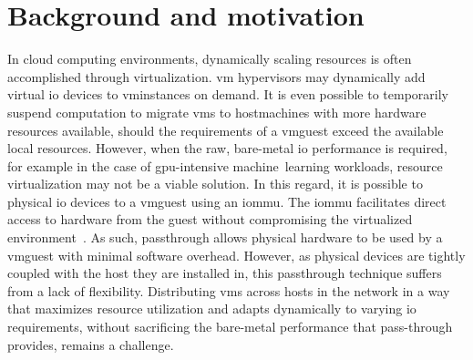 \section{Background and motivation}\label{sec:motivation}
In cloud computing environments, dynamically scaling resources is often accomplished through virtualization. 
%
\Gls{vm} \glspl{hypervisor} may dynamically add virtual \gls{io} devices to \glspl{vminstance} on demand.
%
It is even possible to temporarily suspend computation to migrate \glspl{vm} to \glspl{hostmachine} with more hardware resources available, should the requirements of a \gls{vmguest} exceed the available local resources.
%
However, when the raw, bare-metal \gls{io} performance is required, for example in the case of \gls{gpu}-intensive machine~learning workloads, resource virtualization may not be a viable solution.
%
In this regard, it is possible to  physical \gls{io} devices to a \gls{vmguest} using an \gls{iommu}.
%
The \gls{iommu} facilitates direct access to hardware from the \gls{guest} without compromising the virtualized environment~\cite{whitepaper:Abramson2006,Muli2006}.
%
As such, \gls{passthrough} allows physical hardware to be used by a \gls{vmguest} with minimal software overhead.
%
However, as physical devices are tightly coupled with the \gls{host} they are installed in, this \gls{passthrough} technique suffers from a lack of flexibility.
%
Distributing \glspl{vm} across \glspl{host} in the network in a way that maximizes resource utilization and adapts dynamically to varying \gls{io} requirements, without sacrificing the bare-metal performance that pass-through provides, remains a challenge.



